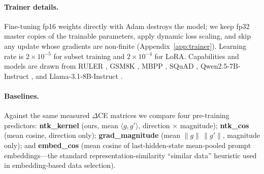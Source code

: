 \documentclass{article} %
\begin{document}
\begin{table}[t]
\centering
\small
\caption{Validation settings. All use $n_{\text{train}}=32$, $n_{\text{eval}}=30$ per capability,
3 epochs; outcome is gold-answer $\Delta$CE.}
\label{tab:settings}
\end{table}

\paragraph{Trainer details.}
Fine-tuning fp16 weights directly with Adam \citep{kingma2015adam} destroys the model; we keep
fp32 master copies of the trainable parameters, apply dynamic loss scaling, and skip any update
whose gradients are non-finite (Appendix~\ref{app:trainer}). Learning rate is $2\times10^{-5}$
for subset training and $2\times10^{-4}$ for LoRA. Capabilities and models are drawn from RULER
\citep{hsieh2024ruler}, GSM8K \citep{cobbe2021gsm8k}, MBPP \citep{austin2021mbpp}, SQuAD
\citep{rajpurkar2016squad}, Qwen2.5-7B-Instruct \citep{qwen2p5}, and Llama-3.1-8B-Instruct
\citep{llama3}.

\paragraph{Baselines.}
Against the same measured $\Delta$CE matrices we compare four pre-training predictors:
\textbf{ntk\_kernel} (ours, mean $\langle g,g'\rangle$, direction $\times$ magnitude);
\textbf{ntk\_cos} (mean cosine, direction only);
\textbf{grad\_magnitude} (mean $\|g\|\,\|g'\|$, magnitude only); and
\textbf{embed\_cos} (mean cosine of last-hidden-state mean-pooled prompt embeddings---the
standard representation-similarity ``similar data'' heuristic used in embedding-based data
selection).
\end{document}
